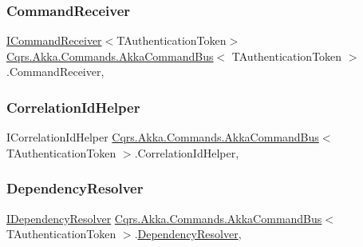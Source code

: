 \subsubsection{\texorpdfstring{Command\+Receiver}{CommandReceiver}}
{\footnotesize\ttfamily \hyperlink{interfaceCqrs_1_1Commands_1_1ICommandReceiver}{I\+Command\+Receiver}$<$T\+Authentication\+Token$>$ \hyperlink{classCqrs_1_1Akka_1_1Commands_1_1AkkaCommandBus}{Cqrs.\+Akka.\+Commands.\+Akka\+Command\+Bus}$<$ T\+Authentication\+Token $>$.Command\+Receiver\hspace{0.3cm}{\ttfamily [get]}, {\ttfamily [protected]}}

\mbox{\label{classCqrs_1_1Akka_1_1Commands_1_1AkkaCommandBus_ad8bdf5674c0d5ea3fd9340bd8cd4b0a8_ad8bdf5674c0d5ea3fd9340bd8cd4b0a8}} 
\subsubsection{\texorpdfstring{Correlation\+Id\+Helper}{CorrelationIdHelper}}
{\footnotesize\ttfamily I\+Correlation\+Id\+Helper \hyperlink{classCqrs_1_1Akka_1_1Commands_1_1AkkaCommandBus}{Cqrs.\+Akka.\+Commands.\+Akka\+Command\+Bus}$<$ T\+Authentication\+Token $>$.Correlation\+Id\+Helper\hspace{0.3cm}{\ttfamily [get]}, {\ttfamily [protected]}}

\mbox{\label{classCqrs_1_1Akka_1_1Commands_1_1AkkaCommandBus_ae1229644077b0740d9014708d15b44c2_ae1229644077b0740d9014708d15b44c2}} 
\subsubsection{\texorpdfstring{Dependency\+Resolver}{DependencyResolver}}
{\footnotesize\ttfamily \hyperlink{interfaceCqrs_1_1Configuration_1_1IDependencyResolver}{I\+Dependency\+Resolver} \hyperlink{classCqrs_1_1Akka_1_1Commands_1_1AkkaCommandBus}{Cqrs.\+Akka.\+Commands.\+Akka\+Command\+Bus}$<$ T\+Authentication\+Token $>$.\hyperlink{classCqrs_1_1Configuration_1_1DependencyResolver}{Dependency\+Resolver}\hspace{0.3cm}{\ttfamily [get]}, {\ttfamily [protected]}}

